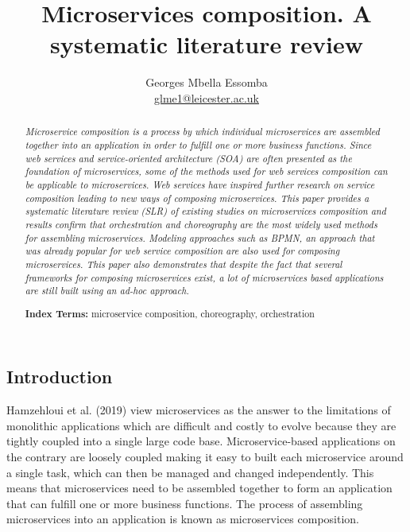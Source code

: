 \documentclass{article}
\begin{document}
\author{Georges Mbella Essomba \\ \href{mailto:glme1@leicester.ac.uk}{glme1@leicester.ac.uk} }
\title{Microservices composition. A systematic literature review}

\maketitle{} %

\pagebreak %
\tableofcontents %
\listoffigures
\listoftables
\pagebreak %

\renewcommand*\abstractname{\flushleft\textbf{Abstract}\hfill}
\begin{multicols}{2}
\begin{abstract}
\emph{Microservice composition is a process by which individual microservices are assembled together into an application in order to fulfill one or more business functions. Since web services and service-oriented architecture (SOA) are often presented as the foundation of microservices, some of the methods used for web services composition can be applicable to microservices. Web services have inspired further research on service composition leading to new ways of composing microservices. This paper provides a systematic literature review (SLR) of existing studies on microservices composition and results confirm that orchestration and choreography are the most widely used methods for assembling microservices. Modeling approaches such as BPMN, an approach that was already popular for web service composition are also used for composing microservices. This paper also demonstrates that despite the fact that several frameworks for composing microservices exist, a lot of microservices based applications are still built using an ad-hoc approach.}

\textbf{Index Terms:} microservice composition, choreography, orchestration

\noindent 


\end{abstract}

\section{Introduction}
Hamzehloui et al. (2019) view microservices as the answer to the limitations of monolithic applications which are difficult and costly to evolve because they are tightly coupled into a single large code base. Microservice-based applications on the contrary are loosely coupled making it easy to built each microservice around a single task, which can then be managed and changed independently. This means that microservices need to be assembled together to form an application that can fulfill one or more business functions. The process of assembling microservices into an application is known as microservices composition. 


\end{multicols}
\end{document}
